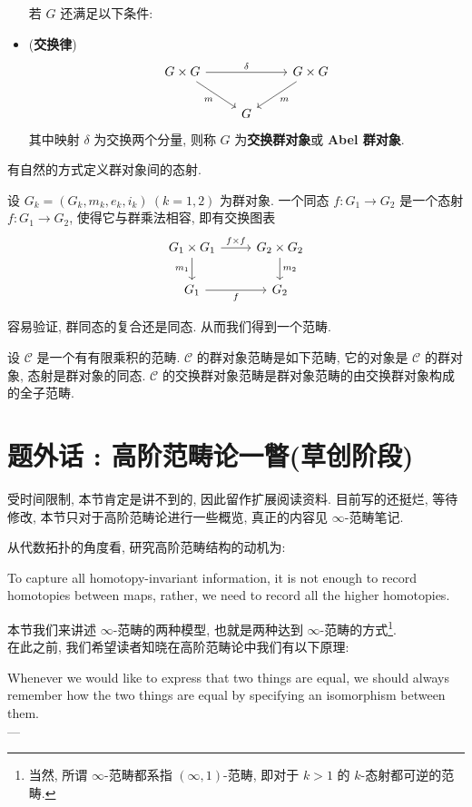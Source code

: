 \begin{definition}
\begin{itemize}
    若 $G$ 还满足以下条件:
    \item (\textbf{交换律})
    \[\begin{tikzcd}
	{G\times G} && {G\times G} \\
	& G
	\arrow["\delta", from=1-1, to=1-3]
	\arrow["m"', from=1-1, to=2-2]
	\arrow["m", from=1-3, to=2-2]
    \end{tikzcd}\]
    其中映射 $\delta$ 为交换两个分量,
    则称 $G$ 为\textbf{交换群对象}或 \textbf{Abel 群对象}.
\end{itemize}

\end{definition}

有自然的方式定义群对象间的态射.

\begin{definition}
    设 $G_k = (G_k, m_k, e_k, i_k) \ (k=1,2)$ 为群对象.
    一个同态 $f: G_1 \to G_2$ 是一个态射 $f: G_1 \to G_2$, 
    使得它与群乘法相容, 即有交换图表
    \[\begin{tikzcd}
	{G_1\times G_1} & {G_2\times G_2} \\
	{G_1} & {G_2}
	\arrow["{f\times f}", from=1-1, to=1-2]
	\arrow["{m_1}"', from=1-1, to=2-1]
	\arrow["{m_2}", from=1-2, to=2-2]
	\arrow["f"', from=2-1, to=2-2]
    \end{tikzcd}\]
\end{definition}

容易验证, 群同态的复合还是同态. 从而我们得到一个范畴.

\begin{definition}
    设 $\mathcal{C}$ 是一个有有限乘积的范畴.
    $\mathcal{C}$ 的群对象范畴是如下范畴,
    它的对象是 $\mathcal{C}$ 的群对象,
    态射是群对象的同态.
    $\mathcal{C}$ 的交换群对象范畴是群对象范畴的由交换群对象构成的全子范畴.
\end{definition}

\section{题外话 : 高阶范畴论一瞥(草创阶段)}
\begin{remark}
    受时间限制, 本节肯定是讲不到的, 因此留作扩展阅读资料. 目前写的还挺烂, 等待修改, 本节只对于高阶范畴论进行一些概览, 真正的内容见 $\infty$-范畴笔记.
\end{remark}
从代数拓扑的角度看, 研究高阶范畴结构的动机为:
\begin{center}
    To capture all homotopy-invariant information, it is not enough to record homotopies between maps, rather, we need to record all the higher homotopies.
\end{center}
本节我们来讲述 $\infty$-范畴的两种模型, 也就是两种达到 $\infty$-范畴的方式\footnote{当然, 所谓 $\infty$-范畴都系指 $(\infty,1)$-范畴, 即对于 $k >1$ 的 $k$-态射都可逆的范畴.}.\\
在此之前, 我们希望读者知晓在高阶范畴论中我们有以下原理:
\begin{center}
    Whenever we would like to express that two things are equal, we should always remember how the two things are equal by specifying an isomorphism between them.\\
    \hfill ---\cite[]{CisinskiFormalization}
\end{center}
    
